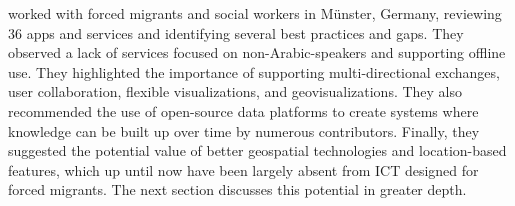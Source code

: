  worked with forced migrants and social workers in Münster, Germany, reviewing 36 apps and services and identifying several best practices and gaps. They observed a lack of services focused on non-Arabic-speakers and supporting offline use. They highlighted the importance of supporting multi-directional exchanges, user collaboration, flexible visualizations, and geovisualizations. They also recommended the use of open-source data platforms to create systems where knowledge can be built up over time by numerous contributors. Finally, they suggested the potential value of better geospatial technologies and location-based features, which up until now have been largely absent from ICT designed for forced migrants. The next section discusses this potential in greater depth.

